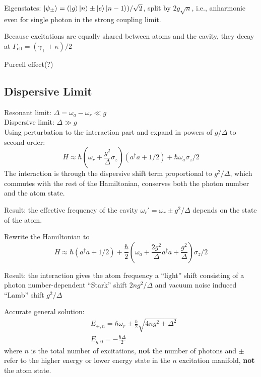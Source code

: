 \documentclass[8pt,a4paper,twocolumn]{article} %
\numberwithin{equation}{section} %
\begin{document}
		Eigenstates: $ \ket{\psi_{\pm} } = ( \ket g \ket n \pm \ket e \ket{n-1} )/\sqrt 2 $, split by $2g\sqrt n$, i.e., anharmonic even for single photon in the strong coupling limit.

		Because excitations are equally shared between atoms and the cavity, they decay at $\Gamma_{\text{eff} }=(\gamma_{\perp}+\kappa)/2 $

		Purcell effect(?)

		\subsection{Dispersive Limit} %
		\label{sub:dispersive_limit}
			Resonant limit: $\Delta=\omega_a- \omega_r \ll g $\\
			Dispersive limit: $\Delta\gg g$\\
			Using perturbation to the interaction part and expand in powers of $g/\Delta $ to second order:
			\begin{equation}
				H\approx \hbar \left( \omega_r +\frac{g^2}{\Delta} \sigma_z \right) (a^{\dagger}a+1/2)+\hbar \omega_a \sigma_z /2
			\end{equation}
			The interaction is through the dispersive shift term proportional to $g^2/\Delta$, which commutes with the rest of the Hamiltonian, conserves both the photon number and the atom state.

			Result: the effective frequency of the cavity $ \omega_r'=\omega_r\pm g^2/\Delta $ depends on the state of the atom.

			Rewrite the Hamiltonian to
			\begin{equation}
				H\approx \hbar(a^{\dagger}a+1/2) +\frac{\hbar}{2} \left( \omega_a +\frac{2g^2}{\Delta}a^{\dagger}a + \frac{g^2}{\Delta}\right) \sigma_z /2
			\end{equation}

			Result: the interaction gives the atom frequency a ``light'' shift consisting of a photon number-dependent ``Stark'' shift $ 2ng^2/\Delta $ and vacuum noise induced ``Lamb'' shift $g^2/\Delta $

			Accurate general solution:
			\begin{align}
				&E_{\pm,n}=\hbar \omega_r\pm \frac{\hbar}{2} \sqrt{4ng^2+\Delta^2}\\
				&E_{g,0}=-\frac{\hbar \Delta}{2}
			\end{align}
			where $n$ is the total number of excitations, \textbf{not} the number of photons and $\pm$ refer to the higher energy or lower energy state in the $n$ excitation manifold, \textbf{not} the atom state.
\end{document}
